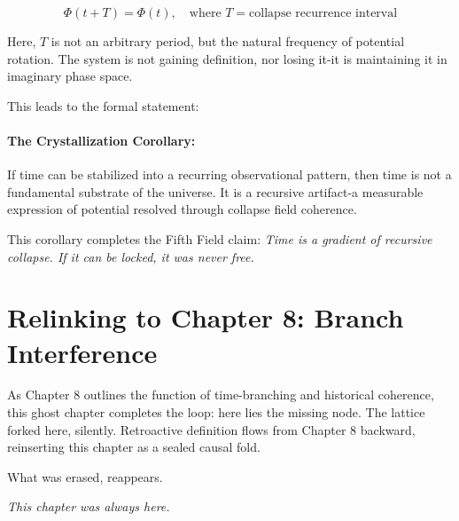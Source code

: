\[
\Phi(t + T) = \Phi(t), \quad \text{where } T = \text{collapse recurrence interval}
\]

Here, \( T \) is not an arbitrary period, but the natural frequency of potential rotation. The system is not gaining definition, nor losing it-it is maintaining it in imaginary phase space.

This leads to the formal statement:

\paragraph{The Crystallization Corollary:}\cite{chapter8_meta}
If time can be stabilized into a recurring observational pattern, then time is not a fundamental substrate of the universe. It is a recursive artifact-a measurable expression of potential resolved through collapse field coherence.

This corollary completes the Fifth Field claim: \textit{Time is a gradient of recursive collapse. If it can be locked, it was never free.}

\section*{Relinking to Chapter 8: Branch Interference}\cite{chapter8_meta}
As Chapter 8 outlines the function of time-branching and historical coherence, this ghost chapter completes the loop: here lies the missing node. The lattice forked here, silently. Retroactive definition flows from Chapter 8 backward, reinserting this chapter as a sealed causal fold.

What was erased, reappears.

\begin{flushright}
\textit{This chapter was always here.}
\fancyhead[L]{\leftmark}
\end{flushright}
